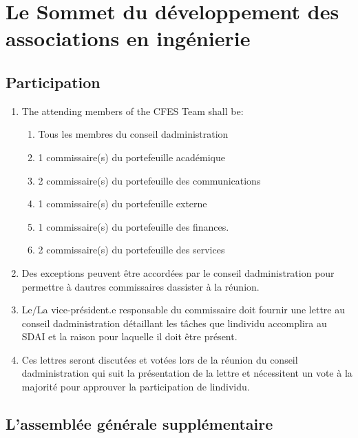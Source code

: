 \section{Le Sommet du développement des associations en ingénierie}
\label{le-sommet-du-developpement-des-associations-en-ingenierie}

\subsection{Participation}
\label{participation-3}

\begin{enumerate}
 \item
  The attending members of the CFES Team shall be:

  \begin{enumerate}
   \item
    Tous les membres du conseil d\textquotesingle administration
   \item
    1 commissaire(s) du portefeuille académique
   \item
    2 commissaire(s) du portefeuille des communications
   \item
    1 commissaire(s) du portefeuille externe
   \item
    1 commissaire(s) du portefeuille des finances.
   \item
    2 commissaire(s) du portefeuille des services
  \end{enumerate}

 \item
  Des exceptions peuvent être accordées par le conseil d\textquotesingle administration pour permettre à d\textquotesingle autres commissaires d\textquotesingle assister à la réunion.

 \item
  Le/La vice-président.e responsable du commissaire doit fournir une lettre au conseil d\textquotesingle administration détaillant les tâches que l\textquotesingle individu accomplira au SDAI et la raison pour laquelle il doit être présent.
 \item
  Ces lettres seront discutées et votées lors de la réunion du conseil d\textquotesingle administration qui suit la présentation de la lettre et nécessitent un vote à la majorité pour approuver la participation de l\textquotesingle individu.
\end{enumerate}

\subsection{L'assemblée générale supplémentaire}
\label{l-assemblee-generale-supplementaire}

